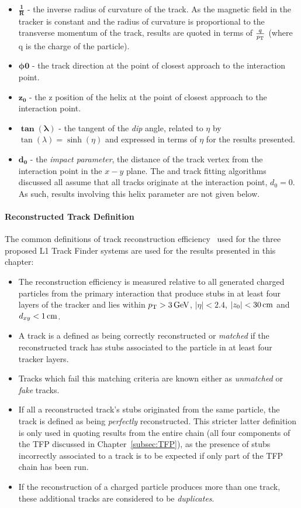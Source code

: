 \begin{itemize}
\item $\mathbf{\frac{1}{R}}$ - the inverse radius of curvature of the track. As the magnetic field in the tracker is constant and the radius of curvature is proportional to the transverse momentum of the track, results are quoted in terms of $\frac{q}{p_{\mathrm{T}}}$ (where q is the charge of the particle).
\item $\mathbf{\phi{0}}$ - the track direction at the point of closest approach to the interaction point.
\item $\mathbf{z_{0}}$ - the z position of the helix at the point of closest approach to the interaction point.
\item $\mathbf{\tan(\lambda)}$ - the tangent of the \emph{dip} angle, related to $\eta$ by $\tan(\lambda) = \sinh (\eta)$ and expressed in terms of $\eta$ for the results presented.
\item $\mathbf{d_{0}}$ - the \emph{impact parameter}, \ie the distance of the track vertex from the interaction point in the $x-y$ plane. The \HT and track fitting algorithms discussed all assume that all tracks originate at the interaction point, \ie $d_{0} = 0$. As such, results involving this helix parameter are not given below.
\end{itemize}

\paragraph{Reconstructed Track Definition}
The common definitions of track reconstruction efficiency~\cite{TMTT_JINST} used for the three proposed L1 Track Finder systems are used for the results presented in this chapter:

\begin{itemize}
\item The reconstruction efficiency is measured relative to all generated charged particles from the primary interaction that produce stubs in at least four layers of the tracker and lies within $p_{\mathrm{T}} > 3\,\text{Ge\hspace{-.08em}V}$, $|\eta| < 2.4$, $|z_{0}| < 30\,\text{cm}$ and $d_{xy} < 1\,\text{cm}$.
\item A track is a defined as being correctly reconstructed or \emph{matched} if the reconstructed track has stubs associated to the particle in at least four tracker layers.
\item Tracks which fail this matching criteria are known either as \emph{unmatched} or \emph{fake} tracks.
\item If all a reconstructed track's stubs originated from the same particle, the track is defined as being \emph{perfectly} reconstructed. 
This stricter latter definition is only used in quoting results from the entire chain (\ie all four components of the TFP discussed in Chapter~\ref{subsec:TFP}), as the presence of stubs incorrectly associated to a track is to be expected if only part of the TFP chain has been run.
\item If the reconstruction of a charged particle produces more than one track, these additional tracks are considered to be \emph{duplicates}.
\end{itemize}

